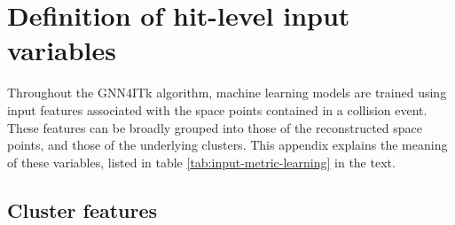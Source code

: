 \appendix
\chapter{Definition of hit-level input variables}
\label{appendix:hit-training-var}
Throughout the GNN4ITk algorithm, machine learning models are trained using input features associated with 
the space points contained in a collision event. 
These features can be broadly grouped into those of the reconstructed space points, and those of the underlying clusters.
This appendix explains the meaning of these variables, listed in table \ref{tab:input-metric-learning} in the text.




\section{Cluster features}





